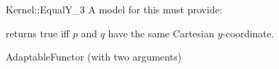 \begin{ccRefFunctionObjectConcept}{Kernel::EqualY_3}
A model for this must provide:


{returns true iff $p$ and $q$ have the same Cartesian $y$-coordinate.}

\ccRefines
AdaptableFunctor (with two arguments)

\ccSeeAlso
{}\\

\end{ccRefFunctionObjectConcept}
